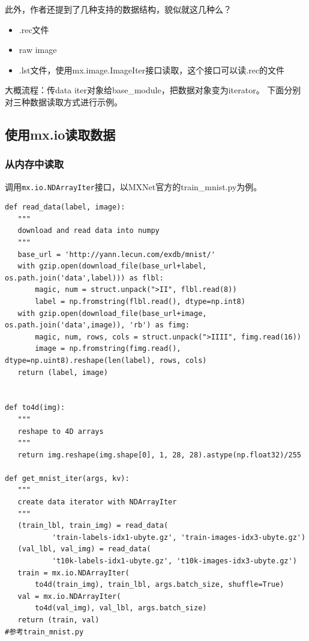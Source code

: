 此外，作者还提到了几种支持的数据结构，貌似就这几种么？
\begin{itemize}
\item .rec文件
\item raw image
\item .lst文件，使用mx.image.ImageIter接口读取，这个接口可以读.rec的文件
\end{itemize}

大概流程：传data iter对象给base\_module，把数据对象变为iterator。
下面分别对三种数据读取方式进行示例。

\subsection{使用mx.io读取数据}

\subsubsection{从内存中读取}

调用\verb|mx.io.NDArrayIter|接口，以MXNet官方的train\_mnist.py为例。

\begin{lstlisting}
def read_data(label, image):
   """
   download and read data into numpy
   """
   base_url = 'http://yann.lecun.com/exdb/mnist/'
   with gzip.open(download_file(base_url+label, os.path.join('data',label))) as flbl:
       magic, num = struct.unpack(">II", flbl.read(8))
       label = np.fromstring(flbl.read(), dtype=np.int8)
   with gzip.open(download_file(base_url+image, os.path.join('data',image)), 'rb') as fimg:
       magic, num, rows, cols = struct.unpack(">IIII", fimg.read(16))
       image = np.fromstring(fimg.read(), dtype=np.uint8).reshape(len(label), rows, cols)
   return (label, image)


def to4d(img):
   """
   reshape to 4D arrays
   """
   return img.reshape(img.shape[0], 1, 28, 28).astype(np.float32)/255

def get_mnist_iter(args, kv):
   """
   create data iterator with NDArrayIter
   """
   (train_lbl, train_img) = read_data(
           'train-labels-idx1-ubyte.gz', 'train-images-idx3-ubyte.gz')
   (val_lbl, val_img) = read_data(
           't10k-labels-idx1-ubyte.gz', 't10k-images-idx3-ubyte.gz')
   train = mx.io.NDArrayIter(
       to4d(train_img), train_lbl, args.batch_size, shuffle=True)
   val = mx.io.NDArrayIter(
       to4d(val_img), val_lbl, args.batch_size)
   return (train, val)
#参考train_mnist.py
\end{lstlisting}

